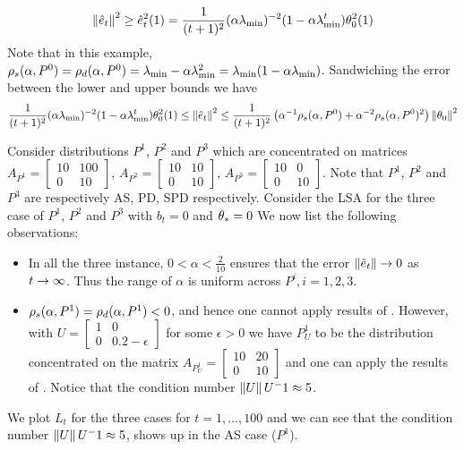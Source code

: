 \begin{itemize}[leftmargin=*, before = \leavevmode\vspace{-\baselineskip}]
\begin{align*}
\left\| \hat{e}_t\right\|^2\geq \hat{e}^2_t(1)=\frac{1}{(t+1)^2}(\alpha \lambda_{\min})^{-2}(1-\alpha \lambda_{\min}^t) \theta^2_0(1)
\end{align*}
Note that in this example, $\rho_s(\alpha,P^0)=\rho_d(\alpha,P^0)=\lambda_{\min} -\alpha \lambda_{\min}^2=\lambda_{\min}(1-\alpha \lambda_{\min})$. Sandwiching the error between the lower and upper bounds we have
\begin{align}
\frac{1}{(t+1)^2}(\alpha \lambda_{\min})^{-2}(1-\alpha \lambda_{\min}^t) \theta^2_0(1)\leq \left\| \hat{e}_t\right\|^2\leq
\frac{1}{(t+1)^2} \left(\alpha^{-1}\rho_s(\alpha,P^0)+\alpha^{-2}\rho_s(\alpha,P^0)^2\right)\left\| \theta_0\right\|^2
\end{align}
\begin{example}
Consider distributions $P^1$, $P^2$ and $P^3$ which are concentrated on matrices $A_{P^1}=\begin{bmatrix} 10 &100\\ 0 &10\end{bmatrix}$, $A_{P^2}=\begin{bmatrix} 10 &10\\ 0 &10\end{bmatrix}$, $A_{P^3}=\begin{bmatrix} 10 &0 \\ 0 &10\end{bmatrix}$. Note that $P^1$, $P^2$ and $P^3$ are respectively AS, PD, SPD respectively. Consider the LSA for the three case of $P^1$, $P^2$ and $P^3$ with $b_t=0$ and $\theta_*=0$
We now list the following observations:
\begin{itemize}%
\item In all the three instance, $0<\alpha<\frac2{10}$ ensures that the error $\left\| \hat{e}_t\right\|\rightarrow 0$ as $t\rightarrow\infty$. Thus the range of $\alpha$ is uniform across $P^i,i=1,2,3$.
\item $\rho_s(\alpha,P^1)=\rho_d(\alpha,P^1)<0$, and hence one cannot apply results of . However, with  $U=\begin{bmatrix}1 &0 \\ 0 &0.2-\epsilon\end{bmatrix}$ for some $\epsilon>0$ we have $P^1_U$ to be the distribution concentrated on the matrix $A_{P^1_U}=\begin{bmatrix} 10 &20 \\ 0 &10\end{bmatrix}$ and one can apply the results of . Notice that the condition number $\left\| U\right\|{U^-1}\approx 5$.
\end{itemize}
We plot $L_t$ for the three cases for $t=1,\ldots,100$ and we can see that the condition number $\left\| U\right\|{U^-1}\approx 5$, shows up in the AS case ($P^1$).
\end{example}
\end{itemize}
